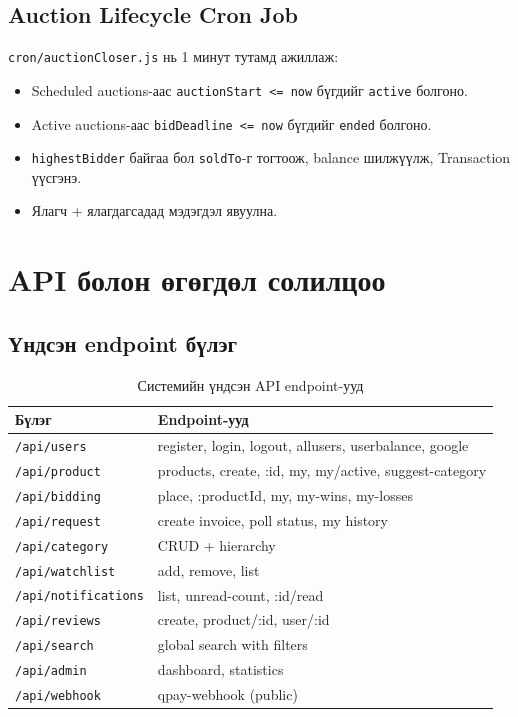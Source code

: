 \documentclass[12pt, a4paper]{report}
\begin{document}
\subsection{Auction Lifecycle Cron Job}

\texttt{cron/auctionCloser.js} нь 1 минут тутамд ажиллаж:
\begin{itemize}
  \item Scheduled auctions-аас \texttt{auctionStart <= now} бүгдийг \texttt{active} болгоно.
  \item Active auctions-аас \texttt{bidDeadline <= now} бүгдийг \texttt{ended} болгоно.
  \item \texttt{highestBidder} байгаа бол \texttt{soldTo}-г тогтоож, balance шилжүүлж, Transaction үүсгэнэ.
  \item Ялагч + ялагдагсадад мэдэгдэл явуулна.
\end{itemize}

\section{API болон өгөгдөл солилцоо}

\subsection{Үндсэн endpoint бүлэг}

\begin{table}[H]
  \centering
  \caption{Системийн үндсэн API endpoint-ууд}
  \label{tab:api-endpoints}
  \begin{tabularx}{\textwidth}{L{3.5cm}L{8.5cm}}
    \toprule
    \textbf{Бүлэг} & \textbf{Endpoint-ууд} \\
    \midrule
    \texttt{/api/users} & register, login, logout, allusers, userbalance, google \\
    \texttt{/api/product} & products, create, :id, my, my/active, suggest-category \\
    \texttt{/api/bidding} & place, :productId, my, my-wins, my-losses \\
    \texttt{/api/request} & create invoice, poll status, my history \\
    \texttt{/api/category} & CRUD + hierarchy \\
    \texttt{/api/watchlist} & add, remove, list \\
    \texttt{/api/notifications} & list, unread-count, :id/read \\
    \texttt{/api/reviews} & create, product/:id, user/:id \\
    \texttt{/api/search} & global search with filters \\
    \texttt{/api/admin} & dashboard, statistics \\
    \texttt{/api/webhook} & qpay-webhook (public) \\
    \bottomrule
  \end{tabularx}
\end{table}
\end{document}
